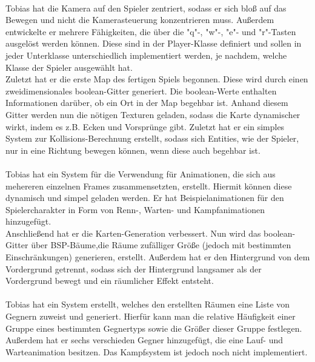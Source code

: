          \\
            Tobias hat die Kamera auf den Spieler zentriert, sodass er sich bloß auf das Bewegen und nicht die Kamerasteuerung konzentrieren muss.
            Außerdem entwickelte er mehrere Fähigkeiten, die über die "q"-, "w"-, "e"- und "r"-Tasten ausgelöst werden  können.
            Diese sind in der Player-Klasse definiert und sollen in jeder Unterklasse unterschiedlich implementiert  werden, je nachdem, welche Klasse der Spieler ausgewählt hat.\\
            Zuletzt hat er die erste Map des fertigen Spiels begonnen.
            Diese wird durch einen zweidimensionales boolean-Gitter generiert.
            Die boolean-Werte enthalten Informationen darüber, ob ein Ort in der Map begehbar ist.
            Anhand diesem Gitter werden nun die nötigen Texturen geladen, sodass die Karte dynamischer wirkt, indem es z.B. Ecken und Vorsprünge gibt.
            Zuletzt hat er ein simples System zur Kollisions-Berechnung erstellt, sodass sich \glqq Entities\grqq{}, wie der Spieler, nur in eine Richtung bewegen können, wenn diese auch begehbar ist.\\

         \\
             Tobias hat ein System für die Verwendung für Animationen, die sich aus mehereren einzelnen Frames zusammensetzten, erstellt.
             Hiermit können diese dynamisch und simpel geladen werden.
             Er hat Beispielanimationen für den Spielercharakter in Form von Renn-, Warten- und Kampfanimationen hinzugefügt.\\
             Anschließend hat er die Karten-Generation verbessert.
             Nun wird das boolean-Gitter über BSP-Bäume,die Räume zufälliger Größe (jedoch mit bestimmten Einschränkungen) generieren, erstellt.
             Außerdem hat er den Hintergrund von dem Vordergrund getrennt, sodass sich der Hintergrund langsamer als der Vordergrund bewegt und ein räumlicher Effekt entsteht.\\
        
         \\
            Tobias hat ein System erstellt, welches den erstellten Räumen eine Liste von Gegnern zuweist und generiert.
            Hierfür kann man die relative Häufigkeit einer Gruppe eines bestimmten Gegnertyps sowie die Größer dieser Gruppe festlegen.\\
            Außerdem hat er sechs verschieden Gegner hinzugefügt, die eine Lauf- und Warteanimation besitzen.
            Das Kampfsystem ist jedoch noch nicht implementiert.\\
        
